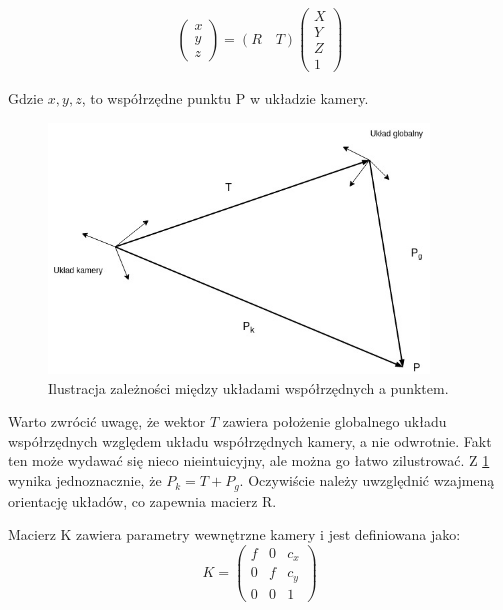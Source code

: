 \documentclass[oneside, eng]{mgr}
\begin{document}
\begin{align*}
	\left( \begin{array}{l} x \\ y \\ z \end{array} \right) =
	(R \quad T)
	\left( \begin{array}{l}
		X \\	Y \\	Z \\	1
	\end{array} \right) 
\end{align*}

Gdzie $x, y, z$, to współrzędne punktu P w układzie kamery.


\begin{figure}
\centering
	\includegraphics[width=0.90\textwidth]{pinhole.jpg}\par\vspace{1cm}
\caption{Ilustracja zależności między układami współrzędnych a punktem.}
	\label{fig:camera_coordinate_systems}
\end{figure}

Warto zwrócić uwagę, że wektor $T$ zawiera położenie globalnego układu współrzędnych względem układu współrzędnych kamery, a nie odwrotnie. Fakt ten może wydawać się nieco nieintuicyjny, ale można go łatwo zilustrować. Z \ref{fig:camera_coordinate_systems} wynika jednoznacznie, że $P_k = T + P_g$. Oczywiście należy uwzględnić wzajmeną orientację układów, co zapewnia macierz R.

Macierz K zawiera parametry wewnętrzne kamery i jest definiowana jako:
\begin{equation}
	K = \left( \begin{array}{lll}
		f & 0 & c_x \\
		0 & f & c_y \\
		0 & 0 & 1
	\end{array} \right)
\end{equation}
\end{document}
